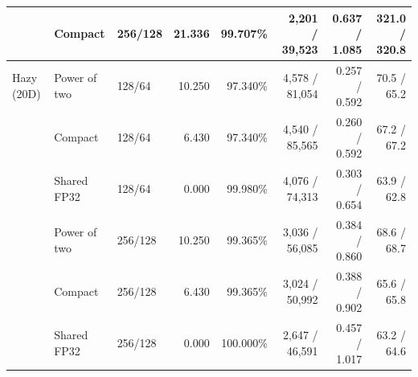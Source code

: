 \begin{table}[t]
\begin{tabular}{@{}lllrrrrr@{}}
   & Compact & 256/128 & 21.336 & 99.707\% & 2,201 / 39,523 & 0.637 / 1.085 & 321.0 / 320.8 \\
  \midrule
  Hazy (20D) & Power of two & 128/64 & 10.250 & 97.340\% & 4,578 / 81,054 & 0.257 / 0.592 & 70.5 / 65.2 \\
   & Compact & 128/64 & 6.430 & 97.340\% & 4,540 / 85,565 & 0.260 / 0.592 & 67.2 / 67.2 \\
   & Shared FP32 & 128/64 & 0.000 & 99.980\% & 4,076 / 74,313 & 0.303 / 0.654 & 63.9 / 62.8 \\
   & Power of two & 256/128 & 10.250 & 99.365\% & 3,036 / 56,085 & 0.384 / 0.860 & 68.6 / 68.7 \\
   & Compact & 256/128 & 6.430 & 99.365\% & 3,024 / 50,992 & 0.388 / 0.902 & 65.6 / 65.8 \\
   & Shared FP32 & 256/128 & 0.000 & 100.000\% & 2,647 / 46,591 & 0.457 / 1.017 & 63.2 / 64.6 \\
  \bottomrule
  \end{tabular}
\end{table}
